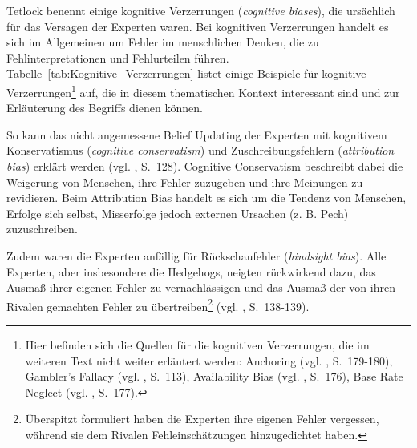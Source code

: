 Tetlock benennt einige kognitive Verzerrungen (\emph{cognitive biases}),
die ursächlich für das Versagen der Experten waren. Bei kognitiven Verzerrungen
handelt es sich im Allgemeinen um Fehler im menschlichen Denken, die zu
Fehlinterpretationen und Fehlurteilen führen.
Tabelle~\ref{tab:Kognitive_Verzerrungen} listet einige Beispiele für kognitive
Verzerrungen\footnote{
Hier befinden sich die Quellen für die kognitiven Verzerrungen, die im weiteren Text nicht
weiter erläutert werden: Anchoring (vgl. \cite{Eisenfuehr}, S.~179-180), Gambler’s Fallacy (vgl. \cite{Reese}, S.~113),
Availability Bias (vgl. \cite{Eisenfuehr}, S.~176), Base Rate Neglect (vgl. \cite{Eisenfuehr}, S.~177).
} auf, die in diesem thematischen Kontext interessant sind und zur
Erläuterung des Begriffs dienen können.

So kann das nicht angemessene Belief Updating der Experten mit kognitivem
Konservatismus (\emph{cognitive conservatism}) und Zuschreibungsfehlern 
(\emph{attribution bias}) erklärt werden (vgl. \cite{Tetlock}, S.~128).
Cognitive Conservatism beschreibt dabei die Weigerung von Menschen, ihre Fehler
zuzugeben und ihre Meinungen zu revidieren. Beim Attribution Bias handelt es
sich um die Tendenz von Menschen, Erfolge sich selbst, Misserfolge jedoch
externen Ursachen (z. B. Pech) zuzuschreiben.

Zudem waren die Experten anfällig für Rückschaufehler (\emph{hindsight bias}).
Alle Experten, aber insbesondere die Hedgehogs, neigten rückwirkend dazu, das Ausmaß ihrer
eigenen Fehler zu vernachlässigen und das Ausmaß der von ihren Rivalen gemachten Fehler zu
übertreiben\footnote{
Überspitzt formuliert haben die Experten ihre eigenen Fehler vergessen, während
sie dem Rivalen Fehleinschätzungen hinzugedichtet haben.
} (vgl. \cite{Tetlock}, S.~138-139).

